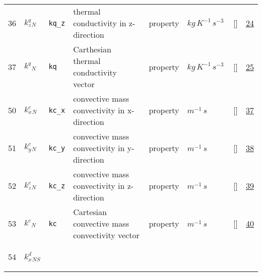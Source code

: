 \begin{longtable}{|p{1cm}|p{3cm}|p{3cm}|p{7cm}|p{3.0cm}|p{3cm}|p{2cm}|p{1cm}|}
    36
             & \hypertarget{"v:36"}{ $ {k^q_z}{_{N}} $}
             & \verb|kq_z|
             & thermal conductivity in z-direction
             & \begin{lay}property \end{lay}
             & $ kg \,K^{-1} \,s^{-3} \, $
             & []
             & \hyperlink{"e:24"}{ 24 }
                 \\
    37
             & \hypertarget{"v:37"}{ $ {k^q}{_{N}} $}
             & \verb|kq|
             & Carthesian thermal conductivity vector
             & \begin{lay}property \end{lay}
             & $ kg \,K^{-1} \,s^{-3} \, $
             & []
             & \hyperlink{"e:25"}{ 25 }
                 \\
    50
             & \hypertarget{"v:50"}{ $ {k^c_x}{_{N}} $}
             & \verb|kc_x|
             & convective mass convectivity in x-direction
             & \begin{lay}property \end{lay}
             & $ m^{-1} \,s \, $
             & []
             & \hyperlink{"e:37"}{ 37 }
                 \\
    51
             & \hypertarget{"v:51"}{ $ {k^c_y}{_{N}} $}
             & \verb|kc_y|
             & convective mass convectivity in y-direction
             & \begin{lay}property \end{lay}
             & $ m^{-1} \,s \, $
             & []
             & \hyperlink{"e:38"}{ 38 }
                 \\
    52
             & \hypertarget{"v:52"}{ $ {k^c_z}{_{N}} $}
             & \verb|kc_z|
             & convective mass convectivity in z-direction
             & \begin{lay}property \end{lay}
             & $ m^{-1} \,s \, $
             & []
             & \hyperlink{"e:39"}{ 39 }
                 \\
    53
             & \hypertarget{"v:53"}{ $ {k^c}{_{N}} $}
             & \verb|kc|
             & Cartesian convective mass convectivity vector
             & \begin{lay}property \end{lay}
             & $ m^{-1} \,s \, $
             & []
             & \hyperlink{"e:40"}{ 40 }
                 \\
    54
             & \hypertarget{"v:54"}{ $ {k^d_x}{_{{N S}}} $}

\end{longtable}
